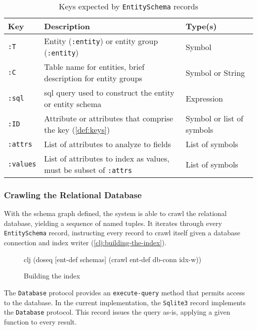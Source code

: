 			\begin{table}
				\centering
				
				\begin{tabular}{lp{9cm}l}
					\toprule
					Key & Description & Type(s) \\
					\midrule
					\texttt{:T} & Entity (\texttt{:entity}) or entity group (\texttt{:entity}) & Symbol \\
					\texttt{:C} & Table name for entities, brief description for entity groups & Symbol or String \\
					\texttt{:sql} & \Gls{sql} query used to construct the entity or entity schema & Expression \\
					\texttt{:ID} & Attribute or attributes that comprise the key (\vref{def:keys}) & Symbol or list of symbols \\
					\texttt{:attrs} & List of attributes to analyze to fields & List of symbols \\
					\texttt{:values} & List of attributes to index as values, must be subset of \texttt{:attrs} & List of symbols \\
					\bottomrule
				\end{tabular}
				
				\caption{Keys expected by \texttt{EntitySchema} records}
				\label{tbl:entity-schema-keys}
			\end{table}
		
		\subsubsection{Crawling the Relational Database}
			With the schema graph defined, the system is able to crawl the relational database, yielding a sequence of named tuples.  It iterates through every \texttt{EntitySchema} record, instructing every record to crawl itself given a database connection and index writer (\vref{clj:building-the-index}).
			
			\begin{figure}
				\begin{singlespaced}
					\begin{pygments}{clj}
(doseq [ent-def schemas]
  (crawl ent-def db-conn idx-w))
					\end{pygments}
				\end{singlespaced}
				
				\caption{Building the index}
				\label{clj:building-the-index}
			\end{figure}
			
			The \texttt{Database} protocol provides an \texttt{execute-query} method that permits access to the database.  In the current implementation, the \texttt{Sqlite3} record implements the \texttt{Database} protocol.  This record issues the query as-is, applying a given function to every result.
			
